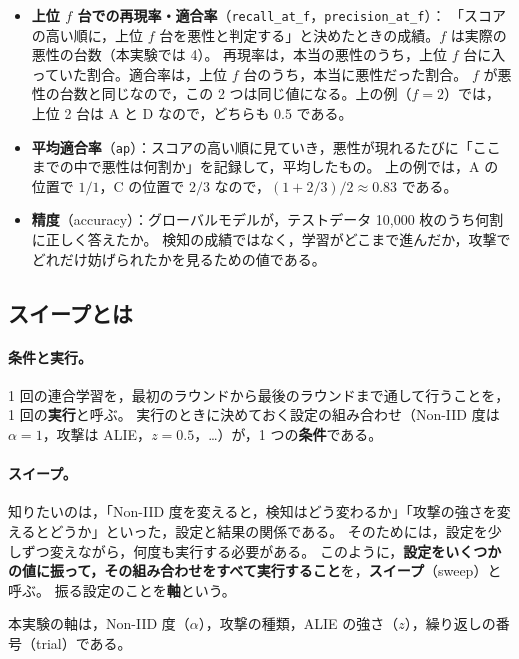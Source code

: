 \documentclass[a4j, dvipdfmx]{jsarticle}  %
\begin{document}
\begin{itemize}
  \item \textbf{上位 $f$ 台での再現率・適合率}（\texttt{recall\_at\_f}，\texttt{precision\_at\_f}）：
        「スコアの高い順に，上位 $f$ 台を悪性と判定する」と決めたときの成績。$f$ は実際の悪性の台数（本実験では 4）。
        再現率は，本当の悪性のうち，上位 $f$ 台に入っていた割合。適合率は，上位 $f$ 台のうち，本当に悪性だった割合。
        $f$ が悪性の台数と同じなので，この 2 つは同じ値になる。上の例（$f = 2$）では，上位 2 台は A と D なので，どちらも 0.5 である。
  \item \textbf{平均適合率}（\texttt{ap}）：スコアの高い順に見ていき，悪性が現れるたびに「ここまでの中で悪性は何割か」を記録して，平均したもの。
        上の例では，A の位置で $1/1$，C の位置で $2/3$ なので，$(1 + 2/3) / 2 \approx 0.83$ である。
  \item \textbf{精度}（accuracy）：グローバルモデルが，テストデータ 10{,}000 枚のうち何割に正しく答えたか。
        検知の成績ではなく，学習がどこまで進んだか，攻撃でどれだけ妨げられたかを見るための値である。
\end{itemize}

\subsection{スイープとは}
\label{sec:sweep}

\paragraph{条件と実行。}
1 回の連合学習を，最初のラウンドから最後のラウンドまで通して行うことを，1 回の\textbf{実行}と呼ぶ。
実行のときに決めておく設定の組み合わせ（Non-IID 度は $\alpha = 1$，攻撃は ALIE，$z = 0.5$，…）が，1 つの\textbf{条件}である。

\paragraph{スイープ。}
知りたいのは，「Non-IID 度を変えると，検知はどう変わるか」「攻撃の強さを変えるとどうか」といった，設定と結果の関係である。
そのためには，設定を少しずつ変えながら，何度も実行する必要がある。
このように，\textbf{設定をいくつかの値に振って，その組み合わせをすべて実行すること}を，\textbf{スイープ}（sweep）と呼ぶ。
振る設定のことを\textbf{軸}という。

本実験の軸は，Non-IID 度（$\alpha$），攻撃の種類，ALIE の強さ（$z$），繰り返しの番号（trial）である。
\end{document}
